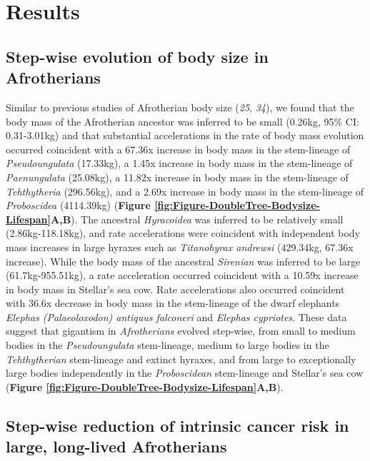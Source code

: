 \documentclass[]{elsarticle} %
\begin{document}
\hypertarget{results}{%
\section{Results}\label{results}}

\hypertarget{step-wise-evolution-of-body-size-in-afrotherians}{%
\subsection{Step-wise evolution of body size in Afrotherians}\label{step-wise-evolution-of-body-size-in-afrotherians}}

Similar to previous studies of Afrotherian body size (\emph{25}, \emph{34}), we found that the body mass of the Afrotherian ancestor was inferred to be small (0.26kg, 95\% CI: 0.31-3.01kg) and that substantial accelerations in the rate of body mass evolution occurred coincident with a 67.36x increase in body mass in the stem-lineage of \emph{Pseudoungulata} (17.33kg), a 1.45x increase in body mass in the stem-lineage of \emph{Paenungulata} (25.08kg), a 11.82x increase in body mass in the stem-lineage of \emph{Tehthytheria} (296.56kg), and a 2.69x increase in body mass in the stem-lineage of \emph{Proboscidea} (4114.39kg) (\textbf{Figure \ref{fig:Figure-DoubleTree-Bodysize-Lifespan}A,B}). The ancestral \emph{Hyracoidea} was inferred to be relatively small (2.86kg-118.18kg), and rate accelerations were coincident with independent body mass increases in large hyraxes such as \emph{Titanohyrax andrewsi} (429.34kg, 67.36x increase). While the body mass of the ancestral \emph{Sirenian} was inferred to be large (61.7kg-955.51kg), a rate acceleration occurred coincident with a 10.59x increase in body mass in Stellar's sea cow. Rate accelerations also occurred coincident with 36.6x decrease in body mass in the stem-lineage of the dwarf elephants \emph{Elephas (Palaeoloxodon) antiquus falconeri} and \emph{Elephas cypriotes}. These data suggest that gigantism in \emph{Afrotherians} evolved step-wise, from small to medium bodies in the \emph{Pseudoungulata} stem-lineage, medium to large bodies in the \emph{Tehthytherian} stem-lineage and extinct hyraxes, and from large to exceptionally large bodies independently in the \emph{Proboscidean} stem-lineage and Stellar's sea cow (\textbf{Figure \ref{fig:Figure-DoubleTree-Bodysize-Lifespan}A,B}).

\hypertarget{step-wise-reduction-of-intrinsic-cancer-risk-in-large-long-lived-afrotherians}{%
\subsection{Step-wise reduction of intrinsic cancer risk in large, long-lived Afrotherians}\label{step-wise-reduction-of-intrinsic-cancer-risk-in-large-long-lived-afrotherians}}
\end{document}
